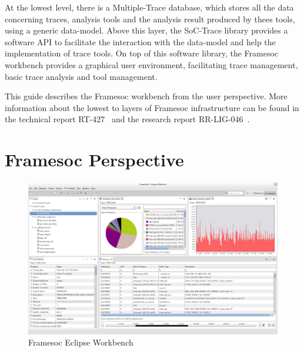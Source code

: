\documentclass[twoside]{article}
\begin{document}
\begin{sloppypar}
At the lowest level, there is a Multiple-Trace database, which stores all the data concerning traces, analysis tools and the analysis result produced by thees tools, using a generic data-model.
Above this layer, the SoC-Trace library provides a software API to facilitate the interaction with the data-model and help the implementation of trace tools.
On top of this software library, the Framesoc workbench provides a graphical user environment, facilitating trace management, basic trace analysis and tool management.

This guide describes the Framesoc workbench from the user perspective. 
More information about the lowest to layers of Framesoc infrastructure can be found in the technical report RT-427~\cite{pagano:hal} and the research report RR-LIG-046~\cite{rrlig46}.

\newpage

\section{Framesoc Perspective}
\label{sec:perspective}

\begin{figure}[h!]
  \centering
    \includegraphics[width=1.0\textwidth]{images/all_perspective_nocategory.png}
  \caption{Framesoc Eclipse Workbench}
  \label{fig:all_perspective}
\end{figure}


\end{sloppypar}
\end{document}
